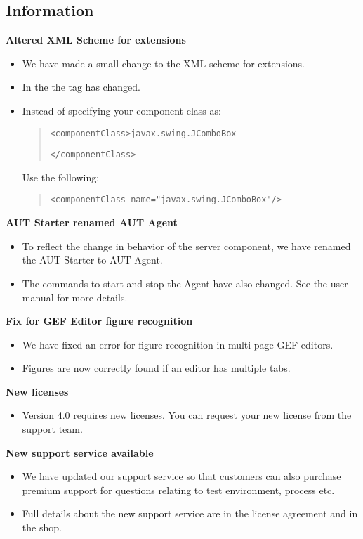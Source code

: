 \subsection{Information}
\textbf{Altered XML Scheme for extensions}
\begin{itemize}
\item We have made a small change to the XML scheme for  extensions. 
\item In the  the tag  has changed.
\item Instead of specifying your component class as:
\begin{quote}
\verb+<componentClass>javax.swing.JComboBox+

\verb+</componentClass>+
\end{quote}
Use the following:
\begin{quote}
\verb+<componentClass name="javax.swing.JComboBox"/>+
\end{quote}
\end{itemize}
\textbf{AUT Starter renamed AUT Agent}
\begin{itemize}
\item To reflect the change in behavior of the server component, we have renamed the AUT Starter to AUT Agent.
\item The commands to start and stop the Agent have also changed. See the user manual for more details.
\end{itemize}
\textbf{Fix for GEF Editor figure recognition}
\begin{itemize}
\item We have fixed an error for figure recognition in multi-page GEF editors.
\item Figures are now correctly found if an editor has multiple tabs.
\end{itemize}
\textbf{New licenses}
\begin{itemize}
\item Version 4.0 requires new licenses. You can request your new license from the support team.
\end{itemize}
\textbf{New support service available}
\begin{itemize}
\item We have updated our support service so that customers can also purchase premium support for questions relating to test environment, process etc.
\item Full details about the new support service are in the license agreement and in the shop.
\end{itemize}


